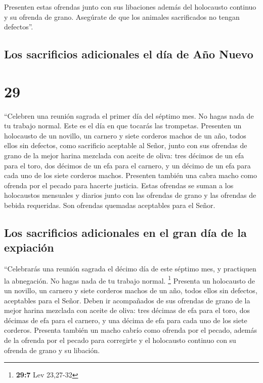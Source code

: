  Presenten estas ofrendas junto con sus libaciones además
del holocausto continuo y su ofrenda de grano. Asegúrate de que los
animales sacrificados no tengan defectos''.

\hypertarget{los-sacrificios-adicionales-el-duxeda-de-auxf1o-nuevo}{%
\subsection{Los sacrificios adicionales el día de Año
Nuevo}\label{los-sacrificios-adicionales-el-duxeda-de-auxf1o-nuevo}}

\hypertarget{section-28}{%
\section{29}\label{section-28}}

 ``Celebren una reunión sagrada el primer día del séptimo
mes. No hagas nada de tu trabajo normal. Este es el día en que tocarás
las trompetas.  Presenten un holocausto de un novillo, un
carnero y siete corderos machos de un año, todos ellos sin defectos,
como sacrificio aceptable al Señor,  junto con sus
ofrendas de grano de la mejor harina mezclada con aceite de oliva: tres
décimos de un efa para el toro, dos décimos de un efa para el carnero,
 y un décimo de un efa para cada uno de los siete corderos
machos.  Presenten también una cabra macho como ofrenda
por el pecado para hacerte justicia.  Estas ofrendas se
suman a los holocaustos mensuales y diarios junto con las ofrendas de
grano y las ofrendas de bebida requeridas. Son ofrendas quemadas
aceptables para el Señor.

\hypertarget{los-sacrificios-adicionales-en-el-gran-duxeda-de-la-expiaciuxf3n}{%
\subsection{Los sacrificios adicionales en el gran día de la
expiación}\label{los-sacrificios-adicionales-en-el-gran-duxeda-de-la-expiaciuxf3n}}

 ``Celebrarás una reunión sagrada el décimo día de este
séptimo mes, y practiquen la abnegación. No hagas nada de tu trabajo
normal. \footnote{\textbf{29:7} Lev 23,27-32}  Presenta un
holocausto de un novillo, un carnero y siete corderos machos de un año,
todos ellos sin defectos, aceptables para el Señor.  Deben
ir acompañados de sus ofrendas de grano de la mejor harina mezclada con
aceite de oliva: tres décimas de efa para el toro, dos décimas de efa
para el carnero,  y una décima de efa para cada uno de
los siete corderos.  Presenta también un macho cabrío
como ofrenda por el pecado, además de la ofrenda por el pecado para
corregirte y el holocausto continuo con su ofrenda de grano y su
libación.


